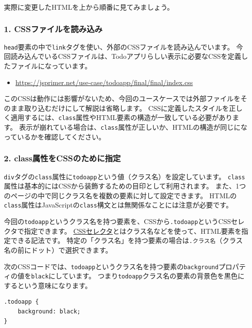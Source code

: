 実際に変更したHTMLを上から順番に見てみましょう。

\hypertarget{comment-css-file-load}{%
\subsubsection{1. CSSファイルを読み込み}\label{comment-css-file-load}}

\texttt{head}要素の中で\texttt{link}タグを使い、外部のCSSファイルを読み込んでいます。
今回読み込んでいるCSSファイルは、Todoアプリらしい表示に必要なCSSを定義したファイルになっています。

\begin{itemize}
\item
  \url{https://jsprimer.net/use-case/todoapp/final/final/index.css}
\end{itemize}

このCSSは動作には影響がないため、今回のユースケースでは外部ファイルをそのまま取り込むだけにして解説は省略します。
CSSに定義したスタイルを正しく適用するには、\texttt{class}属性やHTML要素の構造が一致している必要があります。
表示が崩れている場合は、\texttt{class}属性が正しいか、HTMLの構造が同じになっているかを確認してください。

\hypertarget{comment-class-for-css}{%
\subsubsection{2. class属性をCSSのために指定}\label{comment-class-for-css}}

\texttt{div}タグの\texttt{class}属性に\texttt{todoapp}という値（クラス名）を設定しています。
\texttt{class}属性は基本的にはCSSから装飾するための目印として利用されます。
また、1つのページの中で同じクラス名を複数の要素に対して設定できます。
HTMLの\texttt{class}属性はJavaScriptの\texttt{class}構文とは無関係なことには注意が必要です。

今回の\texttt{todoapp}というクラス名を持つ要素を、CSSから\texttt{.todoapp}というCSSセレクタで指定できます。
\href{https://developer.mozilla.org/ja/docs/Learn/CSS/Introduction_to_CSS/Selectors}{CSSセレクタ}とはクラス名などを使って、HTML要素を指定できる記法です。
特定の「クラス名」を持つ要素の場合は\texttt{.クラス名}（クラス名の前にドット）で選択できます。

次のCSSコードでは、\texttt{todoapp}というクラス名を持つ要素の\texttt{background}プロパティの値を\texttt{black}にしています。
つまり\texttt{todoapp}クラス名の要素の背景色を黒色にするという意味になります。

\begin{lstlisting}
.todoapp {
    background: black;
}
\end{lstlisting}

